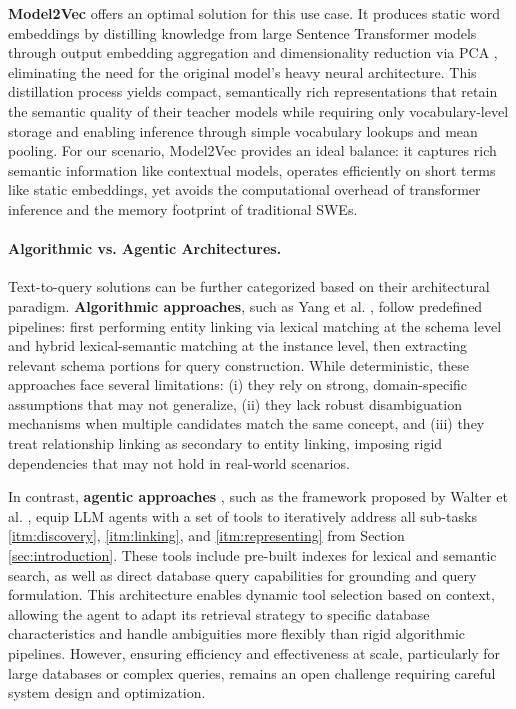\textbf{Model2Vec} \cite{tulkens-2024-model2vec} offers an optimal solution for this use case. It produces static word embeddings by distilling knowledge from large Sentence Transformer models through output embedding aggregation and dimensionality reduction via PCA \cite{shlens-2014-tutorial-pca}, eliminating the need for the original model's heavy neural architecture. This distillation process yields compact, semantically rich representations that retain the semantic quality of their teacher models while requiring only vocabulary-level storage and enabling inference through simple vocabulary lookups and mean pooling. For our scenario, Model2Vec provides an ideal balance: it captures rich semantic information like contextual models, operates efficiently on short terms like static embeddings, yet avoids the computational overhead of transformer inference and the memory footprint of traditional SWEs.

\paragraph{Algorithmic vs. Agentic Architectures.}
Text-to-query solutions can be further categorized based on their architectural paradigm. \textbf{Algorithmic approaches}, such as Yang et al. \cite{yang-etal-2026-enhancing}, follow predefined pipelines: first performing entity linking via lexical matching at the schema level and hybrid lexical-semantic matching at the instance level, then extracting relevant schema portions for query construction. While deterministic, these approaches face several limitations: (i) they rely on strong, domain-specific assumptions that may not generalize, (ii) they lack robust disambiguation mechanisms when multiple candidates match the same concept, and (iii) they treat relationship linking as secondary to entity linking, imposing rigid dependencies that may not hold in real-world scenarios.

In contrast, \textbf{agentic approaches} \cite{yao-etal-2023-react, schick-etal-2023-toolformer, patil-etal-2023-gorilla}, such as the framework proposed by Walter et al. \cite{grasp-walter-bast-2025, grasp-entity-linking-2025}, equip LLM agents with a set of tools to iteratively address all sub-tasks \ref{itm:discovery}, \ref{itm:linking}, and \ref{itm:representing} from Section \ref{sec:introduction}. These tools include pre-built indexes for lexical and semantic search, as well as direct database query capabilities for grounding and query formulation. This architecture enables dynamic tool selection based on context, allowing the agent to adapt its retrieval strategy to specific database characteristics and handle ambiguities more flexibly than rigid algorithmic pipelines. However, ensuring efficiency and effectiveness at scale, particularly for large databases or complex queries, remains an open challenge requiring careful system design and optimization.
